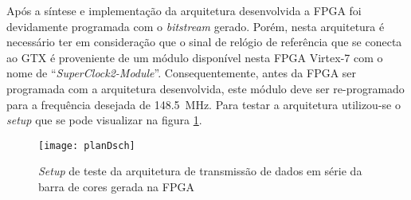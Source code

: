%



Após a síntese e implementação da arquitetura desenvolvida a FPGA foi devidamente programada com o \textit{bitstream} gerado. Porém, nesta arquitetura é necessário ter em consideração que o sinal de relógio de referência que se conecta ao GTX é proveniente de um módulo disponível nesta FPGA Virtex-7 com o nome de ``\textit{SuperClock2-Module}''. Consequentemente, antes da FPGA ser programada com a arquitetura desenvolvida, este módulo deve ser re-programado para a frequência desejada de \SI{148.5}{\mega\hertz}. Para testar a arquitetura utilizou-se o \textit{setup} que se pode visualizar na figura \ref{fig:planD_setup}.
\begin{figure}[h!]
	\begin{center}
		\leavevmode
		\texttt{[image: planDsch]}
		\captionsetup{width=1.0\linewidth}
		\caption[\textit{Setup} de teste da arquitetura]{\textit{Setup} de teste da arquitetura de transmissão de dados em série da barra de cores gerada na FPGA}
		\label{fig:planD_setup}
	\end{center}
\end{figure}


